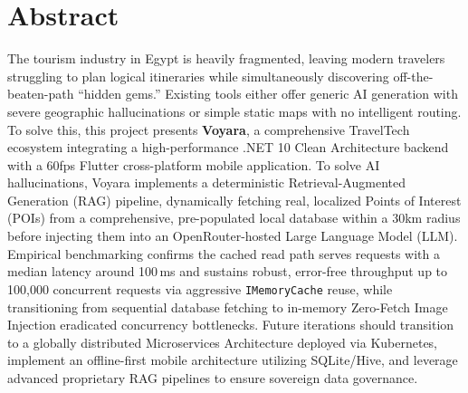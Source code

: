 \documentclass[12pt, a4paper]{report}
\begin{document}
\begin{titlepage}
\begin{center}
    \end{center}
\end{titlepage}


\chapter*{Abstract}

The tourism industry in Egypt is heavily fragmented, leaving modern travelers struggling to plan logical itineraries while simultaneously discovering off-the-beaten-path ``hidden gems.'' Existing tools either offer generic AI generation with severe geographic hallucinations or simple static maps with no intelligent routing. To solve this, this project presents \textbf{Voyara}, a comprehensive TravelTech ecosystem integrating a high-performance .NET 10 Clean Architecture backend with a 60fps Flutter cross-platform mobile application. To solve AI hallucinations, Voyara implements a deterministic Retrieval-Augmented Generation (RAG) pipeline, dynamically fetching real, localized Points of Interest (POIs) from a comprehensive, pre-populated local database within a 30km radius before injecting them into an OpenRouter-hosted Large Language Model (LLM). Empirical benchmarking confirms the cached read path serves requests with a median latency around 100\,ms and sustains robust, error-free throughput up to 100,000 concurrent requests via aggressive \texttt{IMemoryCache} reuse, while transitioning from sequential database fetching to in-memory Zero-Fetch Image Injection eradicated concurrency bottlenecks. Future iterations should transition to a globally distributed Microservices Architecture deployed via Kubernetes, implement an offline-first mobile architecture utilizing SQLite/Hive, and leverage advanced proprietary RAG pipelines to ensure sovereign data governance.

\newpage


\newpage
\tableofcontents
\newpage
\listoffigures
{}
\newpage
\listoftables
{}
\newpage














\appendix





\end{document}
